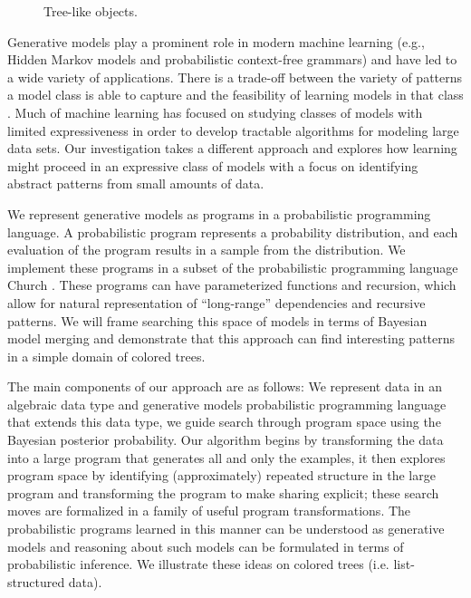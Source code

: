 \documentclass[a4paper,10pt]{article}
\begin{document}
\begin{figure}[b]
\begin{center}
\end{center}
\caption{Tree-like objects.}
\label{fig:plants}
\end{figure}

Generative models play a prominent role in modern machine learning (e.g., Hidden Markov models and probabilistic context-free grammars) and have led to a wide variety of applications.  There is a trade-off between the variety of patterns a model class is able to capture and the feasibility of learning models in that class \cite{Russell2003}.  Much of machine learning has focused on studying classes of models with limited expressiveness in order to develop tractable algorithms for modeling large data sets.  Our investigation takes a different approach and explores how learning might proceed in an expressive class of models with a focus on identifying abstract patterns from small amounts of data.

We represent generative models as programs in a probabilistic programming language. A probabilistic program represents a probability distribution, and each evaluation of the program results in a sample from the distribution. We implement these programs in a subset of the probabilistic programming language Church \cite{N.D.Goodman:2008:f2a0d}.  
These programs can have parameterized functions and recursion, which allow for natural representation of ``long-range'' dependencies and recursive patterns.  We will frame searching this space of models in terms of Bayesian model merging \cite{Stolcke:1994:IPG:645515.658235} and demonstrate that this approach can find interesting patterns in a simple domain of colored trees.

The main components of our approach are as follows: We represent data in an algebraic data type and generative models probabilistic programming language that extends this data type, we guide search through program space using the Bayesian posterior probability. Our algorithm begins by transforming the data into a large program that generates all and only the examples, it then explores program space by identifying (approximately) repeated structure in the large program and transforming the program to make sharing explicit; these search moves are formalized in a family of useful program transformations.
The probabilistic programs learned in this manner can be understood as generative models and reasoning about such models can be formulated in terms of probabilistic inference. We illustrate these ideas on colored trees (i.e. list-structured data).
\end{document}

